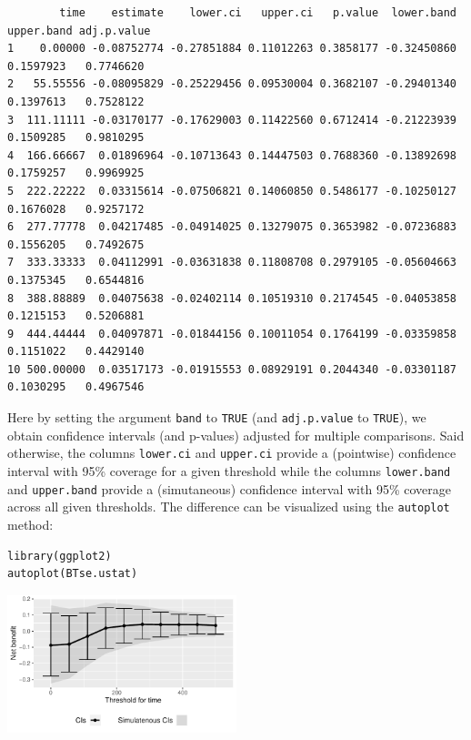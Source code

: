 \documentclass[12pt]{article}
\begin{document}
\begin{verbatim}
        time    estimate    lower.ci   upper.ci   p.value  lower.band upper.band adj.p.value
1    0.00000 -0.08752774 -0.27851884 0.11012263 0.3858177 -0.32450860  0.1597923   0.7746620
2   55.55556 -0.08095829 -0.25229456 0.09530004 0.3682107 -0.29401340  0.1397613   0.7528122
3  111.11111 -0.03170177 -0.17629003 0.11422560 0.6712414 -0.21223939  0.1509285   0.9810295
4  166.66667  0.01896964 -0.10713643 0.14447503 0.7688360 -0.13892698  0.1759257   0.9969925
5  222.22222  0.03315614 -0.07506821 0.14060850 0.5486177 -0.10250127  0.1676028   0.9257172
6  277.77778  0.04217485 -0.04914025 0.13279075 0.3653982 -0.07236883  0.1556205   0.7492675
7  333.33333  0.04112991 -0.03631838 0.11808708 0.2979105 -0.05604663  0.1375345   0.6544816
8  388.88889  0.04075638 -0.02402114 0.10519310 0.2174545 -0.04053858  0.1215153   0.5206881
9  444.44444  0.04097871 -0.01844156 0.10011054 0.1764199 -0.03359858  0.1151022   0.4429140
10 500.00000  0.03517173 -0.01915553 0.08929191 0.2044340 -0.03301187  0.1030295   0.4967546
\end{verbatim}

Here by setting the argument \texttt{band} to \texttt{TRUE} (and \texttt{adj.p.value} to
\texttt{TRUE}), we obtain confidence intervals (and p-values) adjusted for
multiple comparisons. Said otherwise, the columns \texttt{lower.ci} and
\texttt{upper.ci} provide a (pointwise) confidence interval with 95\% coverage
for a given threshold while the columns \texttt{lower.band} and \texttt{upper.band}
provide a (simutaneous) confidence interval with 95\% coverage across
all given thresholds. The difference can be visualized using the
\texttt{autoplot} method:
\lstset{language=r,label= ,caption= ,captionpos=b,numbers=none}
\begin{lstlisting}
library(ggplot2)
autoplot(BTse.ustat)
\end{lstlisting}

\begin{center}
\includegraphics[width=0.5\textwidth]{./figures/gg-sensitivity1.pdf}
\end{center}
\end{document}
